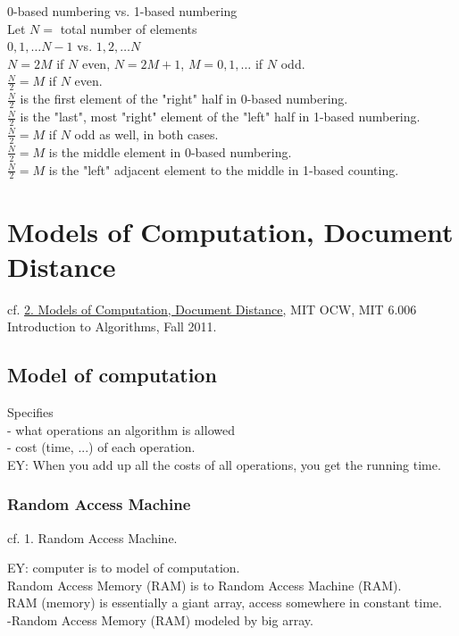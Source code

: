\documentclass[10pt]{amsart}
\begin{document}
0-based numbering vs. 1-based numbering \\
Let $N=$ total number of elements \\

$0,1, \dots N-1$ vs. $1, 2, \dots N$ \\
$N = 2M$ if $N$ even, $N = 2M+1$, $M=0,1, \dots $ if $N$ odd. \\
$\frac{N}{2} = M$ if $N$ even. \\
$\frac{N}{2}$ is the first element of the "right" half in $0$-based numbering. \\
$\frac{N}{2}$ is the "last", most "right" element of the "left" half in 1-based numbering. \\

$\frac{N}{2} = M$ if $N$ odd as well, in both cases. \\
$\frac{N}{2} = M$ is the middle element in 0-based numbering. \\
$\frac{N}{2} = M$ is the "left" adjacent element to the middle in 1-based counting.


\section{Models of Computation, Document Distance}

cf. \href{https://youtu.be/Zc54gFhdpLA}{2. Models of Computation, Document Distance}, MIT OCW, MIT 6.006 Introduction to Algorithms, Fall 2011.

\subsection{Model of computation}

Specifies \\
- what operations an algorithm is allowed \\
- cost (time, ...) of each operation. \\
EY: When you add up all the costs of all operations, you get the running time.

\subsubsection{Random Access Machine}

cf. 1. Random Access Machine.

EY: computer is to model of computation. \\
Random Access Memory (RAM) is to Random Access Machine (RAM). \\
RAM (memory) is essentially a giant array, access somewhere in constant time. \\
-Random Access Memory (RAM) modeled by big array.  
\end{document}
